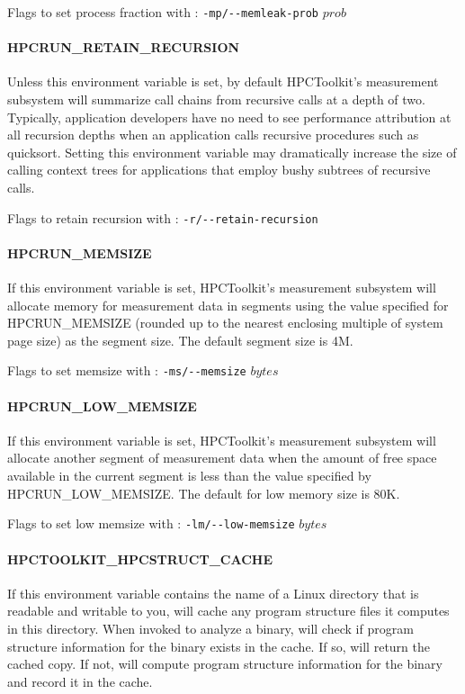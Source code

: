 \parg
Flags to set process fraction with \hpcrun: \verb|-mp/--memleak-prob| $prob$


\paragraph{HPCRUN\_RETAIN\_RECURSION}

Unless this environment variable is set, by default HPCToolkit's
measurement subsystem will summarize call chains from recursive calls
at a depth of two. Typically, application developers have no need
to see performance attribution at all recursion depths when an
application calls recursive procedures such as quicksort. Setting
this environment variable may dramatically increase the size of
calling context trees for applications that employ bushy subtrees
of recursive calls.

\parg
Flags to retain recursion with \hpcrun: \verb|-r/--retain-recursion|

\paragraph{HPCRUN\_MEMSIZE}

If this environment variable is set, HPCToolkit's measurement subsystem
will allocate memory for measurement data in segments using the
value specified for HPCRUN\_MEMSIZE (rounded up to the nearest
enclosing multiple of system page size) as the segment size. The
default segment size is 4M.

\parg
Flags to set memsize with \hpcrun: \verb|-ms/--memsize| $bytes$

\paragraph{HPCRUN\_LOW\_MEMSIZE}

If this environment variable is set, HPCToolkit's measurement subsystem
will allocate another segment of measurement data when the amount
of free space available in the current segment is less than the
value specified by HPCRUN\_LOW\_MEMSIZE. The default for low memory
size is 80K.

\parg
Flags to set low memsize with \hpcrun: \verb|-lm/--low-memsize| $bytes$


\paragraph{HPCTOOLKIT\_HPCSTRUCT\_CACHE}

If this environment variable contains the name of a Linux directory
that is readable and writable to you, \hpcstruct{} will cache any
program structure files it computes in this directory. When invoked
to analyze a binary, \hpcstruct{} will check if program structure
information for the binary exists in the cache. If so, \hpcstruct{}
will return the cached copy.  If not, \hpcstruct{} will compute
program structure information for the binary and record it in the
cache.

